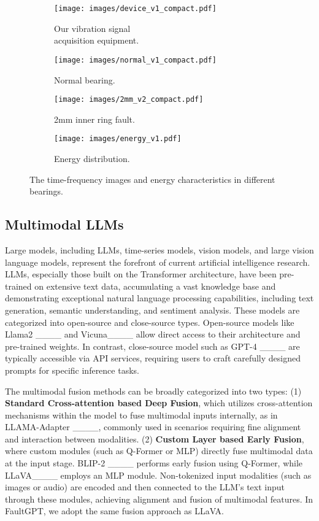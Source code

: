 \begin{figure*}[ht]
  \centering
  \begin{subfigure}[b]{0.20\linewidth}
    \texttt{[image: images/device\_v1\_compact.pdf]}
    \caption{Our vibration signal \\ acquisition equipment.}
    \label{fig:sensors}
  \end{subfigure}
  \begin{subfigure}[b]{0.25\linewidth}
    \texttt{[image: images/normal\_v1\_compact.pdf]}
    \caption{Normal bearing.}
    \label{normal bearing}
  \end{subfigure}
  \begin{subfigure}[b]{0.25\linewidth}
    \texttt{[image: images/2mm\_v2\_compact.pdf]}
    \caption{2mm inner ring fault.}
    \label{2mm inner ring fault}
  \end{subfigure}
  \begin{subfigure}[b]{0.22\linewidth}
    \texttt{[image: images/energy\_v1.pdf]}
    \caption{Energy distribution.}
    \label{fig:energy}
  \end{subfigure}
\caption{The time-frequency images and energy characteristics in different bearings.}
\label{fig:observation}
\vspace{-0.15in}
\end{figure*}

\subsection{Multimodal LLMs}
Large models, including LLMs, time-series models, vision models, and large vision language models, represent the forefront of current artificial intelligence research.
%
LLMs, especially those built on the Transformer architecture, have been pre-trained on extensive text data, accumulating a vast knowledge base and demonstrating exceptional natural language processing capabilities, including text generation, semantic understanding, and sentiment analysis.
%
These models are categorized into open-source and close-source types. Open-source models like Llama2 ____ and Vicuna____ allow direct access to their architecture and pre-trained weights. In contrast, close-source model such as GPT-4 ____ are typically accessible via API services, requiring users to craft carefully designed prompts for specific inference tasks.

The multimodal fusion methods can be broadly categorized into two types: (1) \textbf{Standard Cross-attention based Deep Fusion}, which utilizes cross-attention mechanisms within the model to fuse multimodal inputs internally, as in LLAMA-Adapter ____, commonly used in scenarios requiring fine alignment and interaction between modalities. (2) \textbf{Custom Layer based Early Fusion}, where custom modules (such as Q-Former or MLP) directly fuse multimodal data at the input stage. BLIP-2 ____ performs early fusion using Q-Former, while LLaVA____ employs an MLP module. Non-tokenized input modalities (such as images or audio) are encoded and then connected to the LLM's text input through these modules, achieving alignment and fusion of multimodal features. In FaultGPT, we adopt the same fusion approach as LLaVA.


